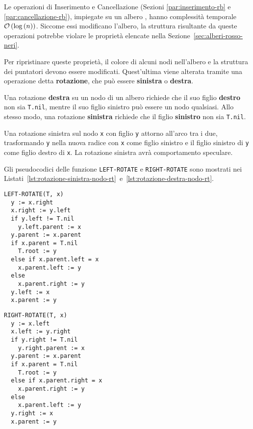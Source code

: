 \documentclass[italian, 10pt]{article}
\begin{document}
Le operazioni di Inserimento e Cancellazione (Sezioni \ref{par:inserimento-rb} e \ref{par:cancellazione-rb}), impiegate su un albero \RB, hanno complessità temporale \(\mathcal{O}\left(\log{(n)}\right)\).
Siccome essi modificano l'albero, la struttura risultante da queste operazioni potrebbe violare le proprietà elencate nella Sezione~\ref{sec:alberi-rosso-neri}.

Per ripristinare queste proprietà, il colore di alcuni nodi nell'albero e la struttura dei puntatori devono essere modificati.
Quest'ultima viene alterata tramite una operazione detta \textbf{rotazione}, che può essere \textbf{sinistra} o \textbf{destra}.

Una rotazione \textbf{destra} su un nodo di un albero \RB richiede che il suo figlio \textbf{destro} non sia \texttt{T.nil}, mentre il suo figlio sinistro può essere un nodo qualsiasi.
Allo stesso modo, una rotazione \textbf{sinistra} richiede che il figlio \textbf{sinistro} non sia \texttt{T.nil}.

Una rotazione sinistra sul nodo \texttt{x} con figlio \texttt{y}  attorno all'arco tra i due, trasformando \texttt{y} nella nuova radice con \texttt{x} come figlio sinistro e il figlio sinistro di \texttt{y} come figlio destro di \texttt{x}.
La rotazione sinistra avrà comportamento speculare.

\bigskip
Gli pseudocodici delle funzione \texttt{LEFT-ROTATE} e \texttt{RIGHT-ROTATE} sono mostrati nei Listati~\ref{lst:rotazione-sinistra-nodo-rt}~e~\ref{lst:rotazione-destra-nodo-rt}.

\begin{minipage}[t]{0.495\linewidth}
  \begin{lstlisting}[style=pseudocode, caption={Rotazione sinistra di un nodo in un RB}, label={lst:rotazione-sinistra-nodo-rt}]
LEFT-ROTATE(T, x)
  y := x.right
  x.right := y.left
  if y.left != T.nil
    y.left.parent := x
  y.parent := x.parent
  if x.parent = T.nil
    T.root := y
  else if x.parent.left = x
    x.parent.left := y
  else
    x.parent.right := y
  y.left := x
  x.parent := y
  \end{lstlisting}
\end{minipage}
\begin{minipage}[t]{0.495\linewidth}
  \begin{lstlisting}[style=pseudocode, caption={Rotazione destra di un nodo in un RB}, label={lst:rotazione-destra-nodo-rt}]
RIGHT-ROTATE(T, x)
  y := x.left
  x.left := y.right
  if y.right != T.nil
    y.right.parent := x
  y.parent := x.parent
  if x.parent = T.nil
    T.root := y
  else if x.parent.right = x
    x.parent.right := y
  else
    x.parent.left := y
  y.right := x
  x.parent := y
  \end{lstlisting}
\end{minipage}
\end{document}
